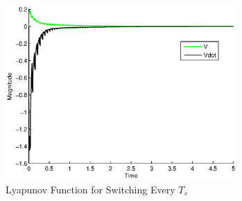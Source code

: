 \documentclass[conference]{IEEEtran}
\begin{document}
\begin{figure}[htp]
\centering
\includegraphics[width=250pt]{lyapSwitchReal}
\caption{Lyapunov Function for Switching Every $T_s$}\label{fig:lyapSwitchReal}
\end{figure}


%
%



%
%
\end{document}
